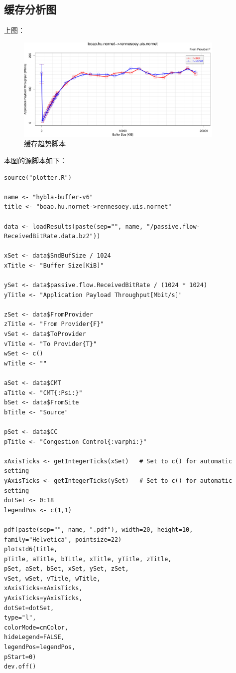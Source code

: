 \documentclass[a4paper,12pt]{ctexbook}
\begin{document}
\begin{flushleft}
\section{缓存分析图}
上图：
\begin{figure}[H]
	\begin{center}
		\includegraphics[width=10cm]{NorNet示例/hybla-buffer-uib-ku缓冲模型/hybla-buffer.pdf}
		\caption{缓存趋势脚本}
	\end{center}
\end{figure}
本图的源脚本如下：
\begin{verbatim}
source("plotter.R")

name <- "hybla-buffer-v6"
title <- "boao.hu.nornet->rennesoey.uis.nornet"

data <- loadResults(paste(sep="", name, "/passive.flow-ReceivedBitRate.data.bz2"))

xSet <- data$SndBufSize / 1024
xTitle <- "Buffer Size[KiB]"

ySet <- data$passive.flow.ReceivedBitRate / (1024 * 1024)
yTitle <- "Application Payload Throughput[Mbit/s]"

zSet <- data$FromProvider
zTitle <- "From Provider{F}"
vSet <- data$ToProvider
vTitle <- "To Provider{T}"
wSet <- c()
wTitle <- ""

aSet <- data$CMT
aTitle <- "CMT{:Psi:}"
bSet <- data$FromSite
bTitle <- "Source"

pSet <- data$CC
pTitle <- "Congestion Control{:varphi:}"

xAxisTicks <- getIntegerTicks(xSet)   # Set to c() for automatic setting
yAxisTicks <- getIntegerTicks(ySet)   # Set to c() for automatic setting
dotSet <- 0:18
legendPos <- c(1,1)

pdf(paste(sep="", name, ".pdf"), width=20, height=10, family="Helvetica", pointsize=22)
plotstd6(title,
pTitle, aTitle, bTitle, xTitle, yTitle, zTitle,
pSet, aSet, bSet, xSet, ySet, zSet,
vSet, wSet, vTitle, wTitle,
xAxisTicks=xAxisTicks,
yAxisTicks=yAxisTicks,
dotSet=dotSet,
type="l",
colorMode=cmColor,
hideLegend=FALSE,
legendPos=legendPos,
pStart=0)
dev.off()
\end{verbatim}


\end{flushleft}
\end{document}
